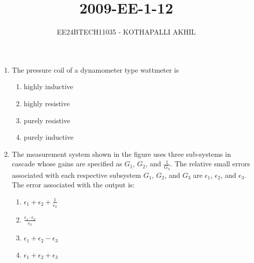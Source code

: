 \documentclass[article]{IEEEtran}
\numberwithin{figure}{enumi}
\begin{document}


\title{2009-EE-1-12}
\author{EE24BTECH11035 - KOTHAPALLI AKHIL}
{\let\newpage\relax\maketitle}

\begin{enumerate}
\item The pressure coil of a dynamometer type wattmeter is  
\begin{enumerate}
\item highly inductive
\item highly resistive
\item purely resistive
\item purely inductive
\end{enumerate}

\item The measurement system shown in the figure uses three sub-systems in cascade whose gains are specified as $G_1$, $G_2$, and $\frac{1}{G_3}$. The relative small errors associated with each respective subsystem $G_1$, $G_2$, and $G_3$ are $\epsilon_1$, $\epsilon_2$, and $\epsilon_3$. The error associated with the output is:  

\begin{enumerate}
\item $\epsilon_1 + \epsilon_2 + \frac{1}{\epsilon_3}$
\item $\frac{\epsilon_1 \cdot \epsilon_2}{\epsilon_3}$
\item $\epsilon_1 + \epsilon_2 - \epsilon_3$
\item $\epsilon_1 + \epsilon_2 + \epsilon_3$
\end{enumerate}


\end{enumerate}
\end{document}
